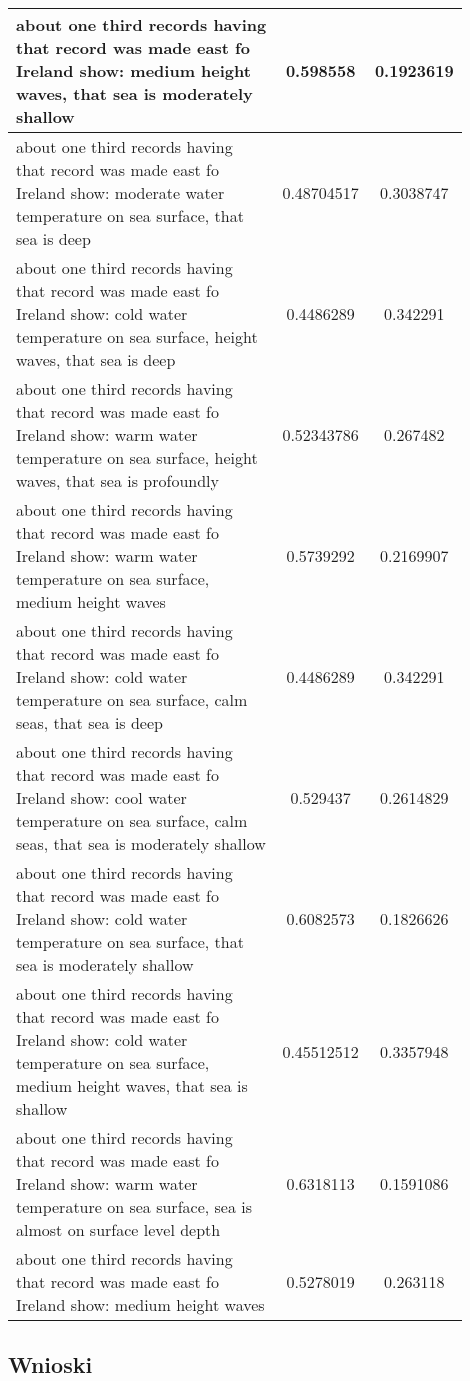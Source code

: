 \documentclass{article}
\begin{document}
\begin{longtable}{|p{0.9\linewidth}|c|c|}
about one third records having that record was made east fo Ireland show: medium height waves, that sea is moderately shallow & 0.598558 & 0.1923619 \\ \hline
about one third records having that record was made east fo Ireland show: moderate water temperature on sea surface, that sea is deep & 0.48704517 & 0.3038747 \\ \hline
about one third records having that record was made east fo Ireland show: cold water temperature on sea surface, height waves, that sea is deep & 0.4486289 & 0.342291 \\ \hline
about one third records having that record was made east fo Ireland show: warm water temperature on sea surface, height waves, that sea is profoundly & 0.52343786 & 0.267482 \\ \hline
about one third records having that record was made east fo Ireland show: warm water temperature on sea surface, medium height waves & 0.5739292 & 0.2169907 \\ \hline
about one third records having that record was made east fo Ireland show: cold water temperature on sea surface, calm seas, that sea is deep & 0.4486289 & 0.342291 \\ \hline
about one third records having that record was made east fo Ireland show: cool water temperature on sea surface, calm seas, that sea is moderately shallow & 0.529437 & 0.2614829 \\ \hline
about one third records having that record was made east fo Ireland show: cold water temperature on sea surface, that sea is moderately shallow & 0.6082573 & 0.1826626 \\ \hline
about one third records having that record was made east fo Ireland show: cold water temperature on sea surface, medium height waves, that sea is shallow & 0.45512512 & 0.3357948 \\ \hline
about one third records having that record was made east fo Ireland show: warm water temperature on sea surface, sea is almost on surface level depth & 0.6318113 & 0.1591086 \\ \hline
about one third records having that record was made east fo Ireland show: medium height waves & 0.5278019 & 0.263118 \\ \hline

\end{longtable}

\subsection{Wnioski}
\end{document}
